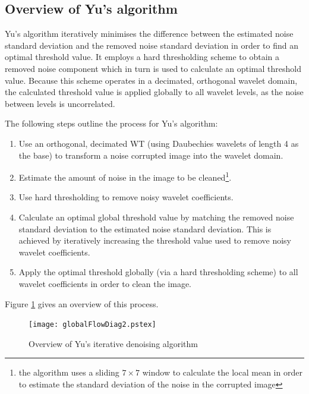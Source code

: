 \documentclass[12pt]{report}
\begin{document}
\subsection{Overview of Yu's algorithm}
\label{subsec:yuOverview}
Yu's algorithm iteratively minimises the difference between the estimated noise standard
deviation and the removed noise standard deviation in order to find an optimal threshold value.
It employs a hard thresholding scheme to obtain a removed noise component which in turn is used to calculate 
an optimal threshold value.
Because this scheme operates in a decimated, orthogonal wavelet domain, 
the calculated threshold value is applied globally to all wavelet levels, as the noise between levels is uncorrelated. 

The following steps outline the process for Yu's algorithm:
\begin{enumerate}
	\item Use an orthogonal, decimated WT (using Daubechies wavelets of length 4 as the base)
	to transform a noise corrupted image into the wavelet domain.
	\item Estimate the amount of noise in the image to be cleaned\footnote{the 
	algorithm uses a sliding $7 \times 7$ window to calculate the
	local mean in order to estimate the standard deviation of the noise in the corrupted image}.
	\item Use hard thresholding to remove noisy wavelet coefficients.
	\item Calculate an optimal global threshold value by matching the removed noise standard deviation to the 
	estimated noise standard deviation.
	This is achieved by iteratively increasing the threshold value used to remove noisy wavelet coefficients.
	\item Apply the optimal threshold globally (via a hard thresholding scheme) to all wavelet coefficients in 
	order to clean the image.
\end{enumerate}
Figure \ref{fig:YuFlow} gives an overview of this process.

\begin{figure}[!ht]
	\begin{center}
		\texttt{[image: globalFlowDiag2.pstex]}
		\caption{Overview of Yu's iterative denoising algorithm}
		\label{fig:YuFlow}
	\end{center}
\end{figure}
\end{document}
